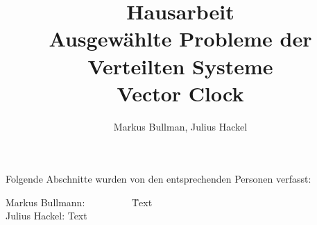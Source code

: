 \documentclass[a4paper]{article}
\author{Markus Bullman, Julius Hackel}
\title{Hausarbeit \\ Ausgewählte Probleme der Verteilten Systeme \\ Vector Clock}
\begin{document}
\maketitle
\tableofcontents
\newpage

Folgende Abschnitte wurden von den entsprechenden Personen verfasst:
\begin{tabbing}
Markus Bullmann:~~~~~~~~~ \= Text \\
Julius Hackel:        \> Text \\

\end{tabbing}

\newpage


\cleardoublepage

\cleardoublepage

\cleardoublepage

\cleardoublepage

\cleardoublepage



\newpage

\end{document}
